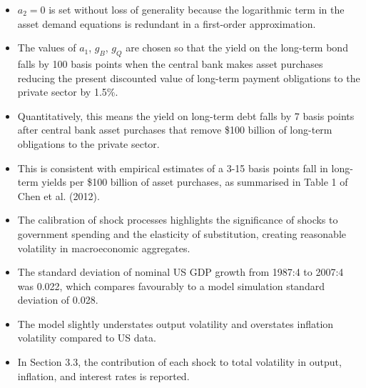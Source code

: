 \documentclass[12pt]{article}
\begin{document}
\begin{itemize}
    \item $a_2 = 0$ is set without loss of generality because the logarithmic term in the asset demand equations is redundant in a first-order approximation.
    \item The values of $a_1$, $g_B$, $g_Q$ are chosen so that the yield on the long-term bond falls by 100 basis points when the central bank makes asset purchases reducing the present discounted value of long-term payment obligations to the private sector by 1.5\%.
    \item Quantitatively, this means the yield on long-term debt falls by 7 basis points after central bank asset purchases that remove \$100 billion of long-term obligations to the private sector.
    \item This is consistent with empirical estimates of a 3-15 basis points fall in long-term yields per \$100 billion of asset purchases, as summarised in Table 1 of Chen et al. (2012).
    \item The calibration of shock processes highlights the significance of shocks to government spending and the elasticity of substitution, creating reasonable volatility in macroeconomic aggregates.
    \item The standard deviation of nominal US GDP growth from 1987:4 to 2007:4 was 0.022, which compares favourably to a model simulation standard deviation of 0.028.
    \item The model slightly understates output volatility and overstates inflation volatility compared to US data.
    \item In Section 3.3, the contribution of each shock to total volatility in output, inflation, and interest rates is reported.
\end{itemize}
\end{document}
